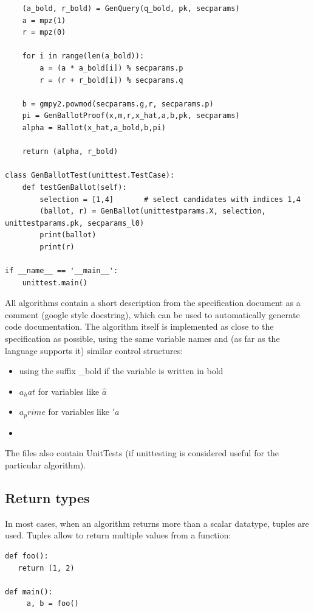 \documentclass[a4paper,12pt]{report}
\begin{document}
\begin{verbatim}
    (a_bold, r_bold) = GenQuery(q_bold, pk, secparams)
    a = mpz(1)
    r = mpz(0)

    for i in range(len(a_bold)):
        a = (a * a_bold[i]) % secparams.p
        r = (r + r_bold[i]) % secparams.q

    b = gmpy2.powmod(secparams.g,r, secparams.p)
    pi = GenBallotProof(x,m,r,x_hat,a,b,pk, secparams)
    alpha = Ballot(x_hat,a_bold,b,pi)

    return (alpha, r_bold)

class GenBallotTest(unittest.TestCase):
    def testGenBallot(self):
        selection = [1,4]       # select candidates with indices 1,4
        (ballot, r) = GenBallot(unittestparams.X, selection, unittestparams.pk, secparams_l0)
        print(ballot)
        print(r)

if __name__ == '__main__':
    unittest.main()
\end{verbatim}

All algorithms contain a short description from the specification document as a comment (google style docstring), which can be used to automatically generate code documentation. The algorithm itself is implemented as close to the specification as possible, using the same variable names and (as far as the language supports it) similar control structures:

\begin{itemize}
	\item using the suffix \_bold if the variable is written in bold
	\item $a_hat$ for variables like $\hat{a}$
	\item $a_prime$ for variables like $\prime{a}$
	\item
\end{itemize}

The files also contain UnitTests (if unittesting is considered useful for the particular algorithm).

\subsection{Return types}
In most cases, when an algorithm returns more than a scalar datatype, tuples are used. Tuples allow to return multiple values from a function:

\begin{verbatim}
def foo():
   return (1, 2)

def main():
	 a, b = foo()
\end{verbatim}
\end{document}

